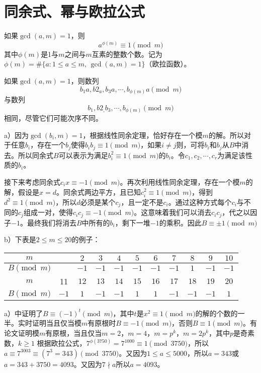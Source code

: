 \chapter{同余式、幂与欧拉公式}
\begin{theorem}[欧拉公式]
如果$\gcd(a, m) = 1$，则
\[a^{\phi(m)}\equiv 1\pmod m\]
其中$\phi(m)$是1与$m$之间与$m$互素的整数个数。记为$\phi(m)=\#\{a:1\le a \le m,\,\gcd(a,m)=1\}$（欧拉函数）。
\end{theorem}
\begin{lemma}
如果$\gcd(a, m) = 1$，则数列
\[b_1a,b2_a, b_3a,\cdots,b_{\phi(m)}a\pmod m\]
与数列
\[b_1,b2_, b_3,\cdots,b_{\phi(m)}\pmod m\]
相同，尽管它们可能次序不同。
\end{lemma}
%
\exercise a）因为$\gcd(b_i,m)=1$，根据线性同余定理，恰好存在一个模$m$的解。所以对于任意$b_i$，存在一个$b_j$使得$b_ib_j\equiv 1\pmod m$，如果$i\not=j$则，可将$b_i$和$b_j$从$B$中消去。所以同余式$B$可以表示为满足$b_i^2\equiv1\pmod m$的$b_i$。令$c_1,c_2,\cdots,c_r$为满足该性质的$b_i$。\par
接下来考虑同余式$c_ix\equiv-1\pmod m$。再次利用线性同余定理，存在一个模$m$的解，假设是$x=d$。同余式两边平方，且已知$c_i^2\equiv 1\pmod m$，得到$d^2\equiv 1\pmod m$，所以$d$必须是某个$c_j$，且一定不是$c_i$。通过这种方式每个$c_i$与不同的$c_j$组成一对，使得$c_ic_j\equiv -1\pmod{m}$。这意味着我们可以消去$c_ic_j$，代之以因子$-1$。最终我们将消去$B$中所有的$b_i$，剩下一堆$-1$的乘积。因此$B\equiv \pm 1\pmod{m}$\par
b）下表是$2\le m\le20$的例子：
\begin{center}
\begin{tabular}{c||c|c|c|c|c|c|c|c|c|c|}
$m$ & & $2$ & $3$ & $4$ & $5$ & $6$ & $7$ & $8$ & $9$ & $10$ \\
\hline
$B\pmod m$ &  & $-1$ & $-1$ & $-1$ & $-1$ & $-1$ & $-1$ & $1$ & $-1$ & $-1$ \\
\hline
\hline
$m$ & 11 & $12$ & $13$ & $14$ & $15$ & $16$ & $17$ & $18$ & $19$ & $20$ \\
\hline
$B\pmod m$ & $-1$ & $1$ & $-1$ & $-1$ & $1$ & $1$ & $-1$ & $-1$ & $-1$ & $1$ \\
\hline
\end{tabular}
\end{center}
a）中证明了$B\equiv (-1)^t\pmod m$，其中$t$是$x^2\equiv 1\pmod m$的解的个数的一半。实时证明当且仅当模$m$有原根时$B\equiv -1\pmod m$，否则$B\equiv 1\pmod m$。有论文证明模$m$有原根，当且仅当$m=2$，$m=4$，$m=p^k$，$m=2p^k$，其中$p$是奇素数，$k\ge1$
%
\exercise 根据欧拉公式，$7^{\phi(3750)}=7^{1000}\equiv1\pmod{3750}$，所以$a\equiv7^{3003}\equiv(7^3=343)\pmod{3750}$。又因为$1\le a\le5000$，所以$a=343$或$a=343+3750=4093$。又因为$7\nmid a$所以$a=4093$。
